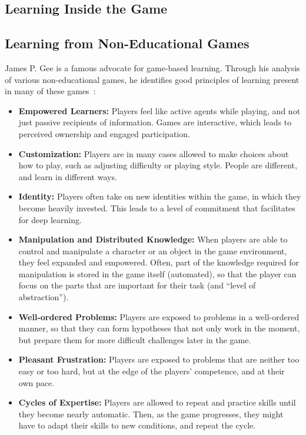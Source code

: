 \subsection{Learning Inside the Game}


\subsection{Learning from Non-Educational Games}
\label{sec:non_educational_games}
James P. Gee is a famous advocate for game-based learning. Through his analysis of various non-educational games, he identifies good principles of learning present in many of these games~\cite{gee:learning_machines}:

\begin{itemize}
	\item{\textbf{Empowered Learners:}} Players feel like active agents while playing, and not just passive recipients of information. Games are interactive, which leads to perceived ownership and engaged participation.
	\item{\textbf{Customization:}} Players are in many cases allowed to make choices about how to play, such as adjusting difficulty or playing style. People are different, and learn in different ways.
	\item{\textbf{Identity:}} Players often take on new identities within the game, in which they become heavily invested. This leads to a level of commitment that facilitates for deep learning.
	\item{\textbf{Manipulation and Distributed Knowledge:}} When players are able to control and manipulate a character or an object in the game environment, they feel expanded and empowered. Often, part of the knowledge required for manipulation is stored in the game itself (automated), so that the player can focus on the parts that are important for their task (and ``level of abstraction'').
	\item{\textbf{Well-ordered Problems:}} Players are exposed to problems in a well-ordered manner, so that they can form hypotheses that not only work in the moment, but prepare them for more difficult challenges later in the game.
	\item{\textbf{Pleasant Frustration:}} Players are exposed to problems that are neither too easy or too hard, but at the edge of the players' competence, and at their own pace.
	\item{\textbf{Cycles of Expertise:}} Players are allowed to repeat and practice skills until they become nearly automatic. Then, as the game progresses, they might have to adapt their skills to new conditions, and repeat the cycle.

\end{itemize}
